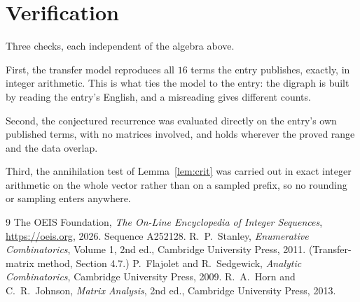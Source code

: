\documentclass[11pt,a4paper]{article}
\theoremstyle{plain}
\theoremstyle{definition}
\begin{document}
\section{Verification}

Three checks, each independent of the algebra above.

First, the transfer model reproduces all $16$ terms the entry publishes, exactly, in
integer arithmetic. This is what ties the model to the entry: the digraph is built by reading
the entry's English, and a misreading gives different counts.

Second, the conjectured recurrence was evaluated directly on the entry's own published terms,
with no matrices involved, and holds wherever the proved range and the data overlap.

Third, the annihilation test of Lemma~\ref{lem:crit} was carried out in exact integer
arithmetic on the whole vector rather than on a sampled prefix, so no rounding or sampling
enters anywhere.

\begin{thebibliography}{9}
 The OEIS Foundation, \emph{The On-Line Encyclopedia of Integer
Sequences}, \url{https://oeis.org}, 2026. Sequence A252128.
 R.~P.~Stanley, \emph{Enumerative Combinatorics}, Volume 1, 2nd ed.,
Cambridge University Press, 2011. (Transfer-matrix method, Section 4.7.)
 P.~Flajolet and R.~Sedgewick, \emph{Analytic Combinatorics}, Cambridge
University Press, 2009.
 R.~A.~Horn and C.~R.~Johnson, \emph{Matrix Analysis}, 2nd ed., Cambridge
University Press, 2013.
\end{thebibliography}
\end{document}
